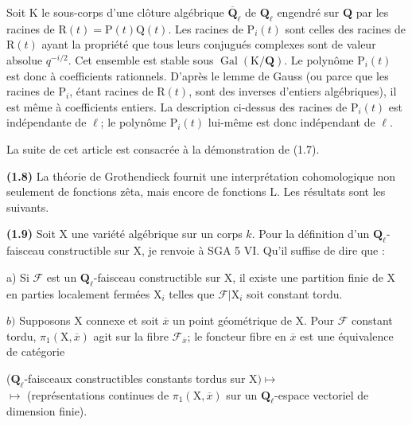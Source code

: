 \documentclass[10pt,leqno]{article}
\begin{document}
\noindent Soit \(\mathrm{K}\) le sous-corps d’une clôture algébrique \(\overline{\mathbf{Q}}_{\ell }\) de \(\mathbf{Q}_{\ell }\) engendré sur \(\mathbf{Q}\) par les racines de \(\mathrm{R}(t)=\mathrm{P}(t)\mathrm{Q}(t)\). Les racines de \(\mathrm{P}_{i}(t)\) sont celles des racines de \(\mathrm{R}(t)\) ayant la propriété que tous leurs conjugués complexes sont de valeur absolue \(q^{- i/2}\). Cet ensemble est stable sous \(\operatorname{Gal}(\mathrm{K}/\mathbf{Q})\). Le polynôme \(\mathrm{P}_{i}(t)\) est donc à coefficients rationnels. D’après le lemme de Gauss (ou parce que les racines de \(\mathrm{P}_{i}\), étant racines de \(\mathrm{R}(t)\), sont des inverses d’entiers algébriques), il est même à coefficients entiers. La description ci-dessus des racines de \(\mathrm{P}_{i}(t)\) est indépendante de \(\ell \); le polynôme \(\mathrm{P}_{i}(t)\) lui-même est donc indépendant de \(\ell \).\par

\noindent La suite de cet article est consacrée à la démonstration de (1.7).\par

\noindent \textbf{(1.8)} La théorie de Grothendieck fournit une interprétation cohomologique non seulement de fonctions zêta, mais encore de fonctions \(\mathrm{L}\). Les résultats sont les suivants.\par

\noindent \textbf{(1.9)} Soit \(\mathrm{X}\) une variété algébrique sur un corps \(k\). Pour la définition d’un \(\mathbf{Q}_{\ell }\)-faisceau constructible sur \(\mathrm{X}\), je renvoie à SGA 5 VI. Qu’il suffise de dire que :\par

\noindent a) Si \(\mathcal{F} \) est un \(\mathbf{Q}_{\ell }\)-faisceau constructible sur \(\mathrm{X}\), il existe une partition finie de \(\mathrm{X}\) en parties localement fermées \(\mathrm{X}_{i}\) telles que \(\mathcal{F} |\mathrm{X}_{i}\) soit constant tordu.\par

\noindent \(b)\) Supposons \(\mathrm{X}\) connexe et soit \(\overline{x}\) un point géométrique de \(\mathrm{X}\). Pour \(\mathcal{F} \) constant tordu, \(\pi _{1}(\mathrm{X},\overline{x})\) agit sur la fibre \(\mathcal{F} _{\overline{x}}\); le foncteur fibre en \(\overline{x}\) est une équivalence de catégorie\par

\begin{center}(\(\mathbf{Q}_{\ell }\)-faisceaux constructibles constants tordus sur \(\mathrm{X}) \longmapsto \)\\ \(\longmapsto \) (représentations continues de \(\pi _{1}(\mathrm{X},\overline{x})\) sur un \(\mathbf{Q}_{\ell }\)-espace vectoriel de dimension finie).\end{center}
\end{document}
